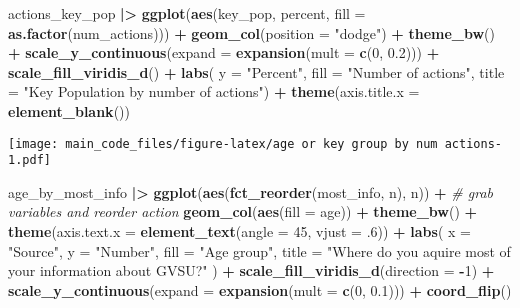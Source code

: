 \documentclass[
]{article}
\newenvironment{Shaded}{\begin{snugshade}}{\end{snugshade}}
\newcommand{\AttributeTok}[1]{\textcolor[rgb]{0.13,0.29,0.53}{#1}}
\newcommand{\CommentTok}[1]{\textcolor[rgb]{0.56,0.35,0.01}{\textit{#1}}}
\newcommand{\DecValTok}[1]{\textcolor[rgb]{0.00,0.00,0.81}{#1}}
\newcommand{\FloatTok}[1]{\textcolor[rgb]{0.00,0.00,0.81}{#1}}
\newcommand{\FunctionTok}[1]{\textcolor[rgb]{0.13,0.29,0.53}{\textbf{#1}}}
\newcommand{\NormalTok}[1]{#1}
\newcommand{\SpecialCharTok}[1]{\textcolor[rgb]{0.81,0.36,0.00}{\textbf{#1}}}
\newcommand{\StringTok}[1]{\textcolor[rgb]{0.31,0.60,0.02}{#1}}
\begin{document}
\begin{Shaded}
\begin{Highlighting}[]
\NormalTok{actions\_key\_pop }\SpecialCharTok{|\textgreater{}}
  \FunctionTok{ggplot}\NormalTok{(}\FunctionTok{aes}\NormalTok{(key\_pop, percent, }\AttributeTok{fill =} \FunctionTok{as.factor}\NormalTok{(num\_actions))) }\SpecialCharTok{+}
  \FunctionTok{geom\_col}\NormalTok{(}\AttributeTok{position =} \StringTok{"dodge"}\NormalTok{) }\SpecialCharTok{+}
  \FunctionTok{theme\_bw}\NormalTok{() }\SpecialCharTok{+}
  \FunctionTok{scale\_y\_continuous}\NormalTok{(}\AttributeTok{expand =} \FunctionTok{expansion}\NormalTok{(}\AttributeTok{mult =} \FunctionTok{c}\NormalTok{(}\DecValTok{0}\NormalTok{, }\FloatTok{0.2}\NormalTok{))) }\SpecialCharTok{+}
  \FunctionTok{scale\_fill\_viridis\_d}\NormalTok{() }\SpecialCharTok{+}
  \FunctionTok{labs}\NormalTok{(}
    \AttributeTok{y =} \StringTok{"Percent"}\NormalTok{,}
    \AttributeTok{fill =} \StringTok{"Number of actions"}\NormalTok{,}
    \AttributeTok{title =} \StringTok{"Key Population by number of actions"}\NormalTok{) }\SpecialCharTok{+}
  \FunctionTok{theme}\NormalTok{(}\AttributeTok{axis.title.x =} \FunctionTok{element\_blank}\NormalTok{())}
\end{Highlighting}
\end{Shaded}

\texttt{[image: main\_code\_files/figure-latex/age or key group by num actions-1.pdf]}

\begin{Shaded}
\begin{Highlighting}[]
\NormalTok{age\_by\_most\_info }\SpecialCharTok{|\textgreater{}}
  \FunctionTok{ggplot}\NormalTok{(}\FunctionTok{aes}\NormalTok{(}\FunctionTok{fct\_reorder}\NormalTok{(most\_info, n), n)) }\SpecialCharTok{+} \CommentTok{\# grab variables and reorder action}
    \FunctionTok{geom\_col}\NormalTok{(}\FunctionTok{aes}\NormalTok{(}\AttributeTok{fill =}\NormalTok{ age))  }\SpecialCharTok{+}
    \FunctionTok{theme\_bw}\NormalTok{() }\SpecialCharTok{+}
    \FunctionTok{theme}\NormalTok{(}\AttributeTok{axis.text.x =} \FunctionTok{element\_text}\NormalTok{(}\AttributeTok{angle =} \DecValTok{45}\NormalTok{, }\AttributeTok{vjust =}\NormalTok{ .}\DecValTok{6}\NormalTok{)) }\SpecialCharTok{+}
    \FunctionTok{labs}\NormalTok{(}
      \AttributeTok{x =} \StringTok{"Source"}\NormalTok{,}
      \AttributeTok{y =} \StringTok{"Number"}\NormalTok{,}
      \AttributeTok{fill =} \StringTok{"Age group"}\NormalTok{,}
      \AttributeTok{title =} \StringTok{"Where do you aquire most of your information about GVSU?"}
\NormalTok{      ) }\SpecialCharTok{+}
    \FunctionTok{scale\_fill\_viridis\_d}\NormalTok{(}\AttributeTok{direction =} \SpecialCharTok{{-}}\DecValTok{1}\NormalTok{) }\SpecialCharTok{+}
    \FunctionTok{scale\_y\_continuous}\NormalTok{(}\AttributeTok{expand =} \FunctionTok{expansion}\NormalTok{(}\AttributeTok{mult =} \FunctionTok{c}\NormalTok{(}\DecValTok{0}\NormalTok{, }\FloatTok{0.1}\NormalTok{))) }\SpecialCharTok{+}
    \FunctionTok{coord\_flip}\NormalTok{()}
\end{Highlighting}
\end{Shaded}
\end{document}
